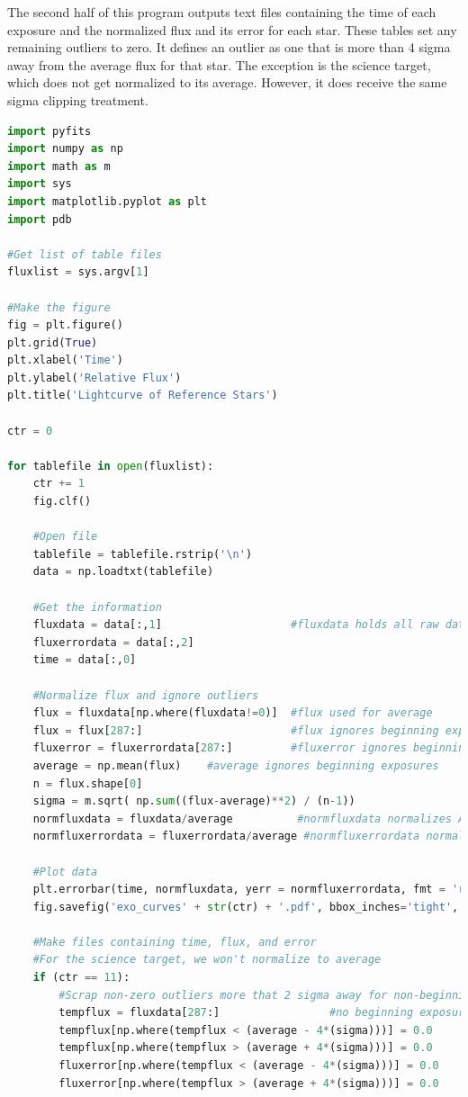 \documentclass{aastex61}
\begin{document}
The second half of this program outputs text files containing the time of each exposure and the normalized flux and its error for each star. These tables set any remaining outliers to zero. It defines an outlier as one that is more than 4 sigma away from the average flux for that star. The exception is the science target, which does not get normalized to its average. However, it does receive the same sigma clipping treatment.
\begin{lstlisting}[language = Python, caption = Plots the lightcurves for each star and outputs fluxes to files (YM and JM)]
import pyfits
import numpy as np
import math as m
import sys
import matplotlib.pyplot as plt
import pdb

#Get list of table files
fluxlist = sys.argv[1]

#Make the figure
fig = plt.figure()
plt.grid(True)
plt.xlabel('Time')
plt.ylabel('Relative Flux')
plt.title('Lightcurve of Reference Stars')

ctr = 0

for tablefile in open(fluxlist):
	ctr += 1
	fig.clf()
	
	#Open file
	tablefile = tablefile.rstrip('\n')
	data = np.loadtxt(tablefile)
	
	#Get the information
	fluxdata = data[:,1]                    #fluxdata holds all raw data
	fluxerrordata = data[:,2]
	time = data[:,0]
	
	#Normalize flux and ignore outliers
	flux = fluxdata[np.where(fluxdata!=0)]  #flux used for average 
	flux = flux[287:]                       #flux ignores beginning exposures (no outliers)
	fluxerror = fluxerrordata[287:]         #fluxerror ignores beginning images 
	average = np.mean(flux)    #average ignores beginning exposures
	n = flux.shape[0]
	sigma = m.sqrt( np.sum((flux-average)**2) / (n-1))
	normfluxdata = fluxdata/average          #normfluxdata normalizes ALL exposures
	normfluxerrordata = fluxerrordata/average #normfluxerrordata normalizes ALL exposures
	
	#Plot data
	plt.errorbar(time, normfluxdata, yerr = normfluxerrordata, fmt = 'r.')
	fig.savefig('exo_curves' + str(ctr) + '.pdf', bbox_inches='tight', dpi=fig.dpi)
	
	#Make files containing time, flux, and error
	#For the science target, we won't normalize to average
	if (ctr == 11):
		#Scrap non-zero outliers more that 2 sigma away for non-beginning exposures
		tempflux = fluxdata[287:]                 #no beginning exposures, HAS outliers
		tempflux[np.where(tempflux < (average - 4*(sigma)))] = 0.0
		tempflux[np.where(tempflux > (average + 4*(sigma)))] = 0.0
		fluxerror[np.where(tempflux < (average - 4*(sigma)))] = 0.0
		fluxerror[np.where(tempflux > (average + 4*(sigma)))] = 0.0
		

\end{lstlisting}
\end{document}
